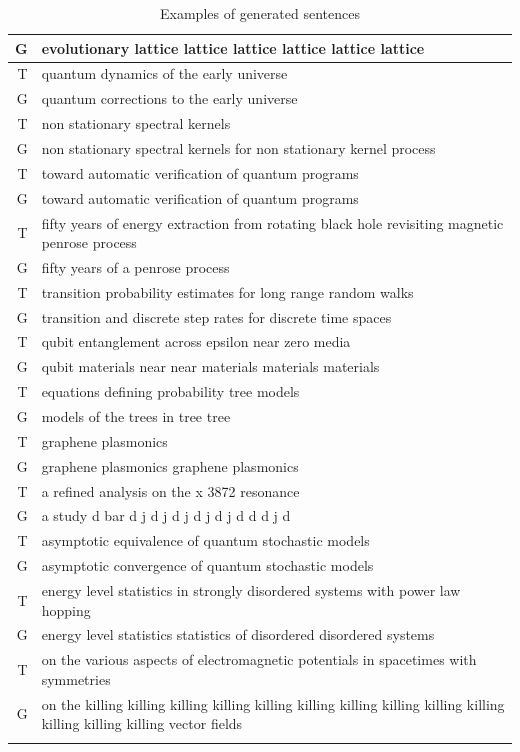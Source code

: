 \documentclass{article}
\begin{document}
\begin{center}
\begin{longtable}{r|p{15cm}}
        G & evolutionary lattice lattice lattice lattice lattice lattice\\
        \hline
        T & quantum dynamics of the early universe \\
        G & quantum corrections to the early universe\\
        \hline
        T & non stationary spectral kernels \\
        G & non stationary spectral kernels for non stationary kernel process\\
        \hline
        T & toward automatic verification of quantum programs \\
        G & toward automatic verification of quantum programs\\
        \hline
        T & fifty years of energy extraction from rotating black hole revisiting magnetic penrose process \\
        G & fifty years of a penrose process\\
        \hline
        T & transition probability estimates for long range random walks \\
        G & transition and discrete step rates for discrete time spaces\\
        \hline
        T & qubit entanglement across epsilon near zero media \\
        G & qubit materials near near materials materials materials \\
        \hline
        T & equations defining probability tree models \\
        G & models of the trees in tree tree\\
        \hline
        T & graphene plasmonics \\
        G & graphene plasmonics graphene plasmonics\\
        \hline
        T & a refined analysis on the x 3872 resonance \\
        G & a study d bar d j d j d j d j d j d d d j d\\
        \hline
        T & asymptotic equivalence of quantum stochastic models \\
        G & asymptotic convergence of quantum stochastic models\\
        \hline
        T & energy level statistics in strongly disordered systems with power law hopping \\
        G & energy level statistics statistics of disordered disordered systems\\
        \hline
        T & on the various aspects of electromagnetic potentials in spacetimes with symmetries \\
        G & on the killing killing killing killing killing killing killing killing killing killing killing killing killing vector fields\\
        \hline
        \bottomrule
        \caption{Examples of generated sentences}
    \end{longtable}
\end{center}
\end{document}
